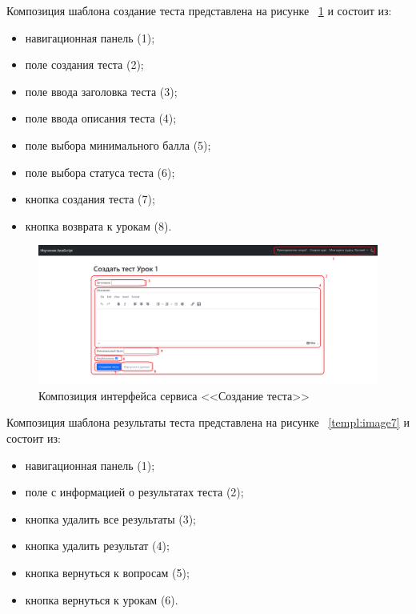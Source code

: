 Композиция шаблона создание теста представлена на рисунке ~\ref{templ:image6} и состоит из:

\begin{itemize}
	\item навигационная панель (1);
	\item поле создания теста (2);
	\item поле ввода заголовка теста (3);
	\item поле ввода описания теста (4);
	\item поле выбора минимального балла (5);
	\item поле выбора статуса теста (6);
	\item кнопка создания теста (7);
	\item кнопка возврата к урокам (8).
\end{itemize}

\begin{figure}[h]
	\centering
	\includegraphics[width=1\linewidth]{images/создатьтест}
	\caption{Композиция интерфейса сервиса <<Создание теста>>}
	\label{templ:image6}
\end{figure}

\newpage
Композиция шаблона результаты теста представлена на рисунке ~\ref{templ:image7} и состоит из:

\begin{itemize}
	\item навигационная панель (1);
	\item поле с информацией о результатах теста (2);
	\item кнопка удалить все результаты (3);
	\item кнопка удалить результат (4);
	\item кнопка вернуться к вопросам (5);
	\item кнопка вернуться к урокам (6).
\end{itemize}

